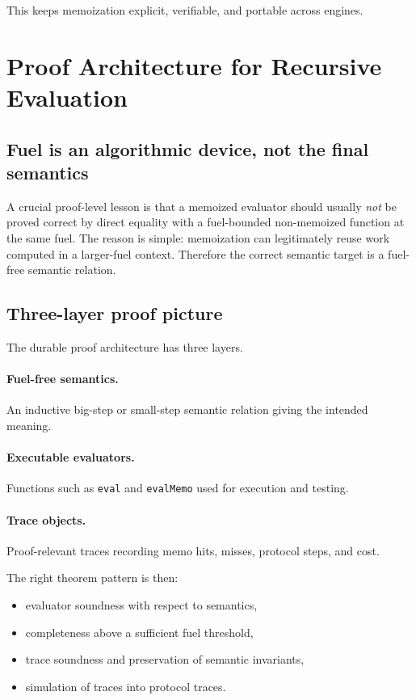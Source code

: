 \documentclass[11pt]{article}
\begin{document}
This keeps memoization explicit, verifiable, and portable across engines.

\section{Proof Architecture for Recursive Evaluation}

\subsection{Fuel is an algorithmic device, not the final semantics}

A crucial proof-level lesson is that a memoized evaluator should usually \emph{not} be proved correct by direct equality with a fuel-bounded non-memoized function at the same fuel. The reason is simple: memoization can legitimately reuse work computed in a larger-fuel context. Therefore the correct semantic target is a fuel-free semantic relation.

\subsection{Three-layer proof picture}

The durable proof architecture has three layers.

\paragraph{Fuel-free semantics.}
An inductive big-step or small-step semantic relation giving the intended meaning.

\paragraph{Executable evaluators.}
Functions such as \texttt{eval} and \texttt{evalMemo} used for execution and testing.

\paragraph{Trace objects.}
Proof-relevant traces recording memo hits, misses, protocol steps, and cost.

The right theorem pattern is then:
\begin{itemize}[leftmargin=2em]
  \item evaluator soundness with respect to semantics,
  \item completeness above a sufficient fuel threshold,
  \item trace soundness and preservation of semantic invariants,
  \item simulation of traces into protocol traces.
\end{itemize}
\end{document}
